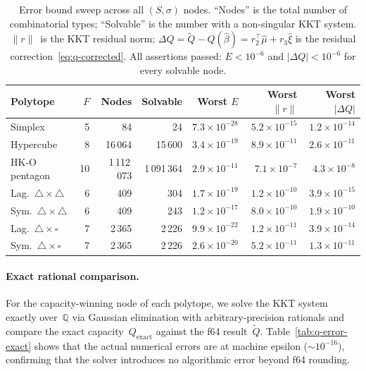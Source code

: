 \begin{table}[h]
\centering
\small
\begin{tabular}{lrrrrrr}
\toprule
Polytope & $F$ & Nodes & Solvable & Worst $E$ & Worst $\|r\|$ & Worst $|\Delta Q|$ \\
\midrule
Simplex              &  5 &         84 &        24 & $7.3\times10^{-28}$ & $5.2\times10^{-15}$ & $1.2\times10^{-14}$ \\
Hypercube            &  8 &     16\,064 &    15\,600 & $3.4\times10^{-19}$ & $8.9\times10^{-11}$ & $2.6\times10^{-11}$ \\
HK-O pentagon        & 10 &  1\,112\,073 & 1\,091\,364 & $2.9\times10^{-11}$ & $7.1\times10^{-7}$  & $4.3\times10^{-8}$  \\
Lag.\ $\triangle{\times}\triangle$ &  6 &        409 &       304 & $1.7\times10^{-19}$ & $1.2\times10^{-10}$ & $3.9\times10^{-15}$ \\
Sym.\ $\triangle{\times}\triangle$ &  6 &        409 &       243 & $1.2\times10^{-17}$ & $8.0\times10^{-10}$ & $1.9\times10^{-10}$ \\
Lag.\ $\triangle{\times}\square$   &  7 &      2\,365 &     2\,226 & $9.9\times10^{-22}$ & $1.2\times10^{-11}$ & $3.9\times10^{-14}$ \\
Sym.\ $\triangle{\times}\square$   &  7 &      2\,365 &     2\,226 & $2.6\times10^{-20}$ & $5.2\times10^{-11}$ & $1.3\times10^{-11}$ \\
\bottomrule
\end{tabular}
\caption{Error bound sweep across all $(S,\sigma)$ nodes.
  ``Nodes'' is the total number of combinatorial types;
  ``Solvable'' is the number with a non-singular KKT system.
  $\|r\|$~is the KKT residual norm;
  $\Delta Q = \tilde{Q} - Q(\hat\beta)
    = r_2^\top\hat\mu + r_3\hat\xi$
  is the residual correction~\eqref{eq:q-corrected}.
  All assertions passed: $E < 10^{-6}$ and $|\Delta Q| < 10^{-6}$
  for every solvable node.}
\label{tab:q-error-sweep}
\end{table}

\paragraph{Exact rational comparison.}
For the capacity-winning node of each polytope, we solve the KKT system
exactly over~$\mathbb{Q}$ via Gaussian elimination with arbitrary-precision
rationals and compare the exact capacity~$Q_{\mathrm{exact}}$ against the
f64 result~$\tilde{Q}$.
Table~\ref{tab:q-error-exact} shows that the actual numerical
errors are at machine epsilon (${\sim}10^{-16}$), confirming
that the solver introduces no algorithmic error beyond f64
rounding.

